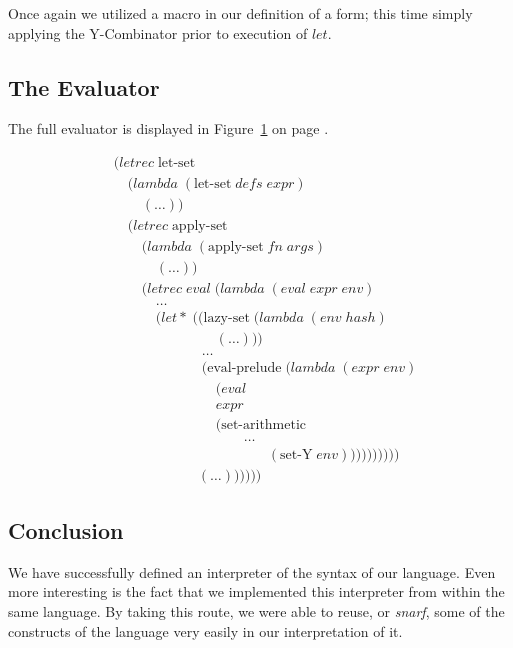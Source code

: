 Once again we utilized a macro in our definition of a form; this time simply
applying the Y-Combinator prior to execution of $let$.

\subsection{The Evaluator}
The full evaluator is displayed in Figure~\ref{fig:fullEval} on page \pageref{fig:fullEval}.

\begin{figure}[htp]
\footnotesize
\caption{}\label{fig:fullEval}
\begin{align*}
& (letrec \; \text{let-set} \; 
\\& \quad (lambda \; (\text{let-set} \; defs \; expr)
\\& \qquad (\dots))
\\& \quad (letrec \; \text{apply-set} \; 
\\& \qquad (lambda \; (\text{apply-set} \; fn \; args)
\\& \qquad \quad (\dots))
\\& \qquad (letrec \; eval \; (lambda \; (eval \; expr \; env)
\\& \qquad \quad \dots
\\& \qquad \quad (let* \; ((\text{lazy-set} \; (lambda \; (env \; hash)
\\& \qquad \qquad \qquad \quad \; (\dots)))
\\& \qquad \qquad \qquad \; \dots
\\& \qquad \qquad \qquad \; (\text{eval-prelude} \; (lambda \; (expr \; env)
\\& \qquad \qquad \qquad \quad \; (eval
\\& \qquad \qquad \qquad \quad \; expr
\\& \qquad \qquad \qquad \quad \; (\text{set-arithmetic}
\\& \qquad \qquad \qquad \qquad \quad \; \dots
\\& \qquad \qquad \qquad \qquad \qquad \quad (\text{set-Y} \; env))))))))))
\\& \qquad \qquad \qquad (\dots))))))
\end{align*}
\end{figure}

\subsection{Conclusion}
We have successfully defined an interpreter of the syntax of our language.
Even more interesting is the fact that we implemented this interpreter from
within the same language. By taking this route, we were able to reuse, or
\emph{snarf}, some of the constructs of the language very easily in our
interpretation of it.


